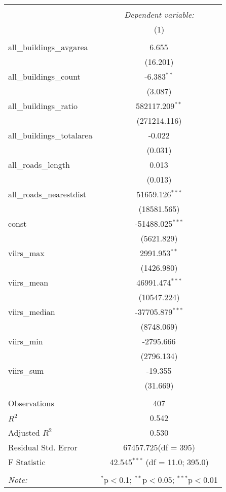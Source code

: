 \begin{table}[!htbp] \centering
\begin{tabular}{@{\extracolsep{5pt}}lc}
\\[-1.8ex]\hline
\hline \\[-1.8ex]
& \multicolumn{1}{c}{\textit{Dependent variable:}} \
\cr \cline{1-2}
\\[-1.8ex] & (1) \\
\hline \\[-1.8ex]
 all_buildings_avgarea & 6.655$^{}$ \\
  & (16.201) \\
 all_buildings_count & -6.383$^{**}$ \\
  & (3.087) \\
 all_buildings_ratio & 582117.209$^{**}$ \\
  & (271214.116) \\
 all_buildings_totalarea & -0.022$^{}$ \\
  & (0.031) \\
 all_roads_length & 0.013$^{}$ \\
  & (0.013) \\
 all_roads_nearestdist & 51659.126$^{***}$ \\
  & (18581.565) \\
 const & -51488.025$^{***}$ \\
  & (5621.829) \\
 viirs_max & 2991.953$^{**}$ \\
  & (1426.980) \\
 viirs_mean & 46991.474$^{***}$ \\
  & (10547.224) \\
 viirs_median & -37705.879$^{***}$ \\
  & (8748.069) \\
 viirs_min & -2795.666$^{}$ \\
  & (2796.134) \\
 viirs_sum & -19.355$^{}$ \\
  & (31.669) \\
\hline \\[-1.8ex]
 Observations & 407 \\
 $R^2$ & 0.542 \\
 Adjusted $R^2$ & 0.530 \\
 Residual Std. Error & 67457.725(df = 395)  \\
 F Statistic & 42.545$^{***}$ (df = 11.0; 395.0) \\
\hline
\hline \\[-1.8ex]
\textit{Note:} & \multicolumn{1}{r}{$^{*}$p$<$0.1; $^{**}$p$<$0.05; $^{***}$p$<$0.01} \\
\end{tabular}
\end{table}
